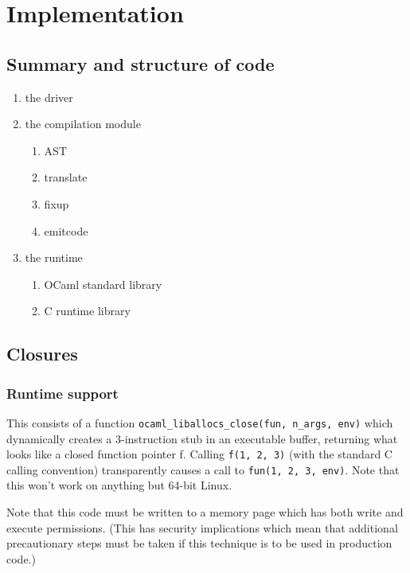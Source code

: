 \documentclass[12pt,a4paper,twoside,openright]{report}
\begin{document}


\chapter{Implementation}

\section{Summary and structure of code}

\begin{enumerate}
  \item the driver
  \item the compilation module
    \begin{enumerate}
      \item AST
      \item translate
      \item fixup
      \item emitcode
    \end{enumerate}
  \item the runtime
    \begin{enumerate}
      \item OCaml standard library
      \item C runtime library
    \end{enumerate}
\end{enumerate}

\section{Closures}

\subsection{Runtime support}

This consists of a function \lstinline{ocaml_liballocs_close(fun, n_args, env)}
which dynamically creates a 3-instruction stub in an executable buffer,
returning what looks like a closed function pointer f. Calling
\lstinline{f(1, 2, 3)}
(with the standard C calling convention) transparently causes a call to
\lstinline{fun(1, 2, 3, env)}.
Note that this won't work on anything but 64-bit Linux.

Note that this code must be written to a memory page which has both write and execute permissions. (This has security implications which mean that additional precautionary steps must be taken if this technique is to be used in production code.)
\end{document}

